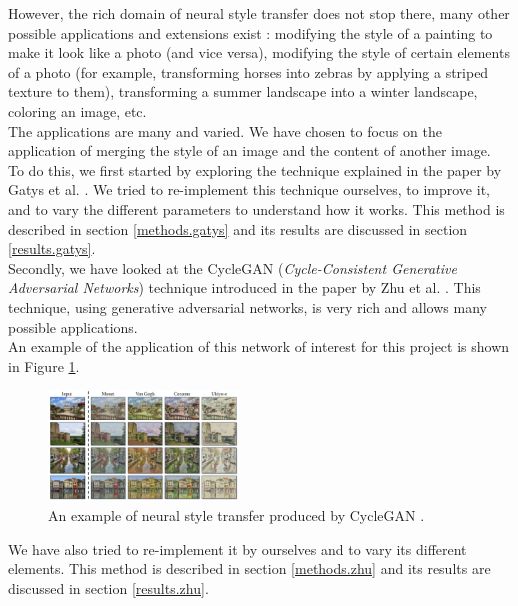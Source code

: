 \documentclass[twocolumn,superscriptaddress,aps]{revtex4-1}
\begin{document}
    However, the rich domain of neural style transfer does not stop there, many other possible applications and extensions exist : modifying the style of a painting to make it look like a photo (and vice versa), modifying the style of certain elements of a photo (for example, transforming horses into zebras by applying a striped texture to them), transforming a summer landscape into a winter landscape, coloring an image, etc.\\
    
    The applications are many and varied. We have chosen to focus on the application of merging the style of an image and the content of another image.\\
    
    To do this, we first started by exploring the technique explained in the paper by Gatys et al. \cite{DBLP:journals/corr/GatysEB15a}. We tried to re-implement this technique ourselves, to improve it, and to vary the different parameters to understand how it works. This method is described in section \ref{methods.gatys} and its results are discussed in section \ref{results.gatys}.\\
    
    Secondly, we have looked at the CycleGAN (\emph{Cycle-Consistent Generative Adversarial Networks}) technique introduced in the paper by Zhu et al. \cite{DBLP:journals/corr/ZhuPIE17}. This technique, using generative adversarial networks, is very rich and allows many possible applications.\\
    
    An example of the application of this network of interest for this project is shown in Figure \ref{fig:introduction.example.cyclegan}.
    
    \begin{figure}[ht]
        \centering
        \includegraphics[width=0.45\textwidth]{resources/png/cyclegan-example.png}
        \caption{An example of neural style transfer produced by CycleGAN \cite{junyanz.github.io}.}
        \label{fig:introduction.example.cyclegan}
    \end{figure}
    
    We have also tried to re-implement it by ourselves and to vary its different elements. This method is described in section \ref{methods.zhu} and its results are discussed in section \ref{results.zhu}.\\
    
\end{document}
